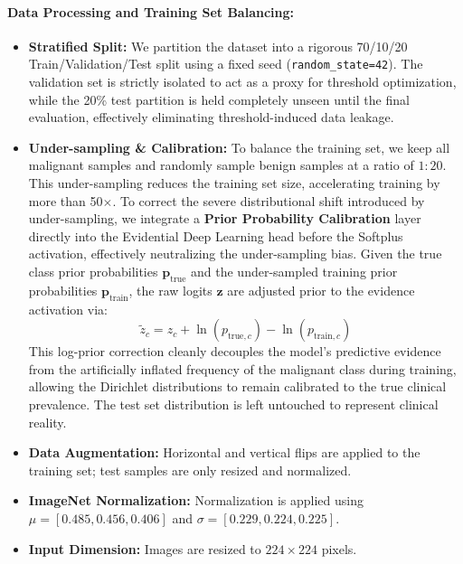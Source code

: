\documentclass[letterpaper]{article} %
\begin{document}
\paragraph{Data Processing and Training Set Balancing:}
\begin{itemize}
    \item \textbf{Stratified Split:} We partition the dataset into a rigorous 70/10/20 Train/Validation/Test split using a fixed seed (\texttt{random\_state=42}). The validation set is strictly isolated to act as a proxy for threshold optimization, while the 20\% test partition is held completely unseen until the final evaluation, effectively eliminating threshold-induced data leakage.
    \item \textbf{Under-sampling \& Calibration:} To balance the training set, we keep all malignant samples and randomly sample benign samples at a ratio of $1:20$. This under-sampling reduces the training set size, accelerating training by more than 50$\times$. To correct the severe distributional shift introduced by under-sampling, we integrate a \textbf{Prior Probability Calibration} layer directly into the Evidential Deep Learning head before the Softplus activation, effectively neutralizing the under-sampling bias. Given the true class prior probabilities $\mathbf{p}_{\text{true}}$ and the under-sampled training prior probabilities $\mathbf{p}_{\text{train}}$, the raw logits $\mathbf{z}$ are adjusted prior to the evidence activation via:
    \begin{equation}
        \tilde{z}_c = z_c + \ln(p_{\text{true}, c}) - \ln(p_{\text{train}, c})
    \end{equation}
    This log-prior correction cleanly decouples the model's predictive evidence from the artificially inflated frequency of the malignant class during training, allowing the Dirichlet distributions to remain calibrated to the true clinical prevalence. The test set distribution is left untouched to represent clinical reality.
    \item \textbf{Data Augmentation:} Horizontal and vertical flips are applied to the training set; test samples are only resized and normalized.
    \item \textbf{ImageNet Normalization:} Normalization is applied using $\mu = [0.485, 0.456, 0.406]$ and $\sigma = [0.229, 0.224, 0.225]$.
    \item \textbf{Input Dimension:} Images are resized to $224 \times 224$ pixels.
\end{itemize}
\end{document}
